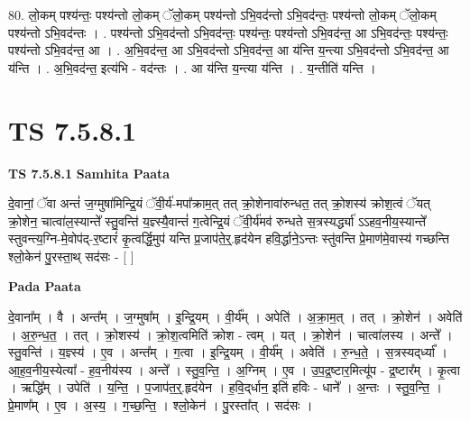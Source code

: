 \documentclass[17pt]{extarticle}
\begin{document}
80. लो॒कम् पश्य॑न्तः॒ पश्य॑न्तो लो॒कम् ॅलो॒कम् पश्य॑न्तो ऽभि॒वद॑न्तो ऽभि॒वद॑न्तः॒ पश्य॑न्तो लो॒कम् ॅलो॒कम् पश्य॑न्तो ऽभि॒वद॑न्तः । . पश्य॑न्तो ऽभि॒वद॑न्तो ऽभि॒वद॑न्तः॒ पश्य॑न्तः॒ पश्य॑न्तो ऽभि॒वद॑न्त॒ आ ऽभि॒वद॑न्तः॒ पश्य॑न्तः॒ पश्य॑न्तो ऽभि॒वद॑न्त॒ आ । . अ॒भि॒वद॑न्त॒ आ ऽभि॒वद॑न्तो ऽभि॒वद॑न्त॒ आ य॑न्ति य॒न्त्या ऽभि॒वद॑न्तो ऽभि॒वद॑न्त॒ आ य॑न्ति । . अ॒भि॒वद॑न्त॒ इत्य॑भि - वद॑न्तः । . आ य॑न्ति य॒न्त्या य॑न्ति । . य॒न्तीति॑ यन्ति । \newline
\pagebreak
{}

\section{ TS 7.5.8.1 }

\textbf{TS 7.5.8.1 } \newline
\textbf{Samhita Paata} \newline

दे॒वानां॒ ॅवा अन्तं॑ ज॒ग्मुषा॑मिन्द्रि॒यं ॅवी॒र्य॑-मपा᳚क्राम॒त् तत् क्रो॒शेनावा॑रुन्धत॒ तत् क्रो॒शस्य॑ क्रोश॒त्वं ॅयत् क्रो॒शेन॒ चात्वा॑ल॒स्यान्ते᳚ स्तु॒वन्ति॑ य॒ज्ञ्स्यै॒वान्तं॑ ग॒त्वेन्द्रि॒यं ॅवी॒र्य॑मव॑ रुन्धते स॒त्रस्यर्द्ध्या॑ ऽऽहव॒नीय॒स्यान्ते᳚ स्तुवन्त्य॒ग्नि-मे॒वोप॑द्-र॒ष्टारं॑ कृ॒त्वर्द्धि॒मुप॑ यन्ति प्र॒जाप॑ते॒र्॒.हृद॑येन हवि॒र्द्धाने॒ऽन्तः स्तु॑वन्ति प्रे॒माण॑मे॒वास्य॑ गच्छन्ति श्लो॒केन॑ पु॒रस्ता॒थ् सद॑सः - [  ] \newline

\textbf{Pada Paata} \newline

दे॒वाना᳚म् । वै । अन्त᳚म् । ज॒ग्मुषा᳚म् । इ॒न्द्रि॒यम् । वी॒र्य᳚म् । अपेति॑ । अ॒क्रा॒म॒त् । तत् । क्रो॒शेन॑ । अवेति॑ । अ॒रु॒न्ध॒त॒ । तत् । क्रो॒शस्य॑ । क्रो॒श॒त्वमिति॑ क्रोश - त्वम् । यत् । क्रो॒शेन॑ । चात्वा॑लस्य । अन्ते᳚ । स्तु॒वन्ति॑ । य॒ज्ञ्स्य॑ । ए॒व । अन्त᳚म् । ग॒त्वा । इ॒न्द्रि॒यम् । वी॒र्य᳚म् । अवेति॑ । रु॒न्ध॒ते॒ । स॒त्रस्यद्‌र्ध्या᳚ । आ॒ह॒व॒नीय॒स्येत्या᳚ - ह॒व॒नीय॑स्य । अन्ते᳚ । स्तु॒व॒न्ति॒ । अ॒ग्निम् । ए॒व । उ॒प॒द्र॒ष्टार॒मित्यू॑प - द्र॒ष्टार᳚म् । कृ॒त्वा । ऋद्धि᳚म् । उपेति॑ । य॒न्ति॒ । प॒जाप॑त॒र्॒.हृद॑येन । ह॒वि॒द्‌र्धान॒ इति॑ हविः - धाने᳚ । अ॒न्तः । स्तु॒व॒न्ति॒ । प्रे॒माण᳚म् । ए॒व । अ॒स्य॒ । ग॒च्छ॒न्ति॒ । श्लो॒केन॑ । पु॒रस्ता᳚त् । सद॑सः ।  \newline
\end{document}

